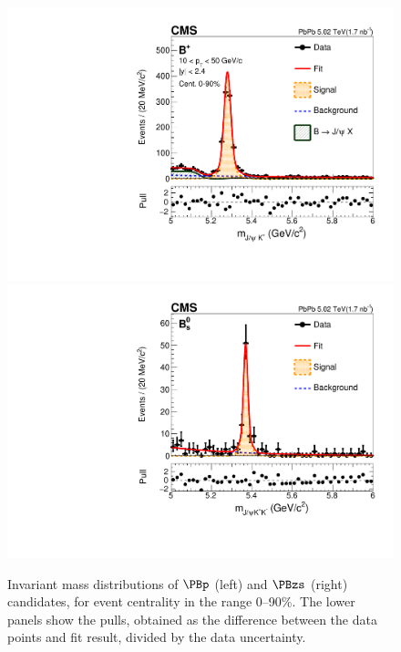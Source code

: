 \documentclass[11pt,twoside,a4paper,cmspaper]{cms-tdr}
\begin{document}
\begin{figure}[t]
\centering
\includegraphics[width=.49\textwidth]{mass_bu.pdf}
\includegraphics[width=.49\textwidth]{mass_bs.pdf}
\caption{Invariant mass distributions of $\PBp$ (left) and $\PBzs$ (right) candidates, 
for event centrality in the range 0--90\%. The lower panels show the pulls, obtained as the difference between the data points and fit result, divided by the data uncertainty.}
\label{fig:massPeaks}
\end{figure}
\end{document}
